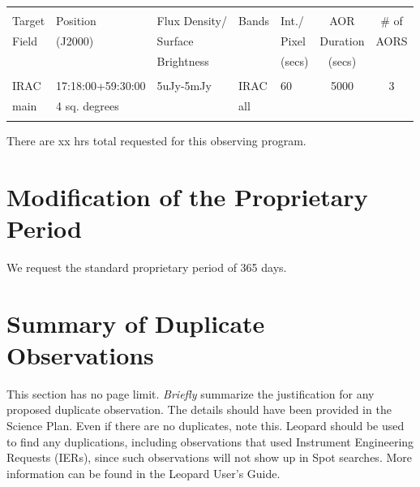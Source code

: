 \documentclass[letterpaper,12pt]{article}
\begin{document}
\bigskip
\begin{tabular}{lllllcc}
\hline \\ 
Target & Position & Flux Density/       & Bands  & Int./ & AOR & \# of \\
Field & (J2000)   & Surface &  & Pixel & Duration & AORS \\
& & Brightness & & (secs) & (secs) & \\
\hline \\ 
IRAC & 17:18:00+59:30:00 & 5uJy-5mJy & IRAC & 60 & 5000 & 3 \\
main & 4 sq. degrees & & all& & &  \\
\hline \\
\end{tabular}

There are xx hrs total requested for this observing program.\newline



\section{Modification of the Proprietary Period}

We request the standard proprietary period of 365 days.

\section{Summary of Duplicate Observations}

This section has no page limit. {\it Briefly} summarize the justification for 
any proposed duplicate observation. The details should have been provided in the
Science Plan.  Even if there are no duplicates, note this. Leopard should be 
used to find any duplications, including observations that used Instrument
Engineering Requests (IERs), since such observations will not
show up in Spot searches. More information can be found in the
Leopard User's Guide.\newline
\end{document}
